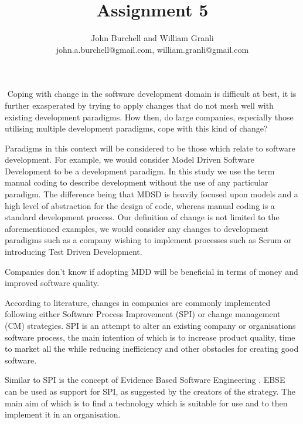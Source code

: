 \documentclass[10pt,twocolumn]{article}
\begin{document}
\title{Assignment 5}

\author{John Burchell and William Granli \\
john.a.burchell@gmail.com, william.granli@gmail.com}


\maketitle
\thispagestyle{empty}




​
Coping with change in the software development domain is difficult at best, it is further exasperated by trying to apply changes that do not mesh well with existing development paradigms. How then, do large companies, especially those utilising multiple development paradigms, cope with this kind of change?

Paradigms in this context will be considered to be those which relate to software development. For example, we would consider Model Driven Software Development to be a development paradigm. In this study we use the term manual coding to describe development without the use of any particular paradigm. The difference being that MDSD is heavily focused upon models and a high level of abstraction for the design of code, whereas manual coding is a standard development process. Our definition of change is not limited to the aforementioned examples, we would consider any changes to development paradigms such as a company wishing to implement processes such as Scrum or introducing Test Driven Development.

Companies don't know if adopting MDD will be beneficial in terms of money and improved software quality.

According to literature, changes in companies are commonly implemented following either Software Process Improvement (SPI)\cite{pettersson2008practitioner}\cite{unterkalmsteiner2012evaluation} or change management (CM) strategies. SPI is an attempt to alter an existing company or organisations software process, the main intention of which is to increase product quality, time to market all the while reducing inefficiency and other obstacles for creating good software. 

Similar to SPI is the concept of Evidence Based Software Engineering \cite{dyba2005evidence}. EBSE can be used as support for SPI, as suggested by the creators of the strategy. The main aim of which is to find a technology which is suitable for use and to then implement it in an organisation.
\end{document}

